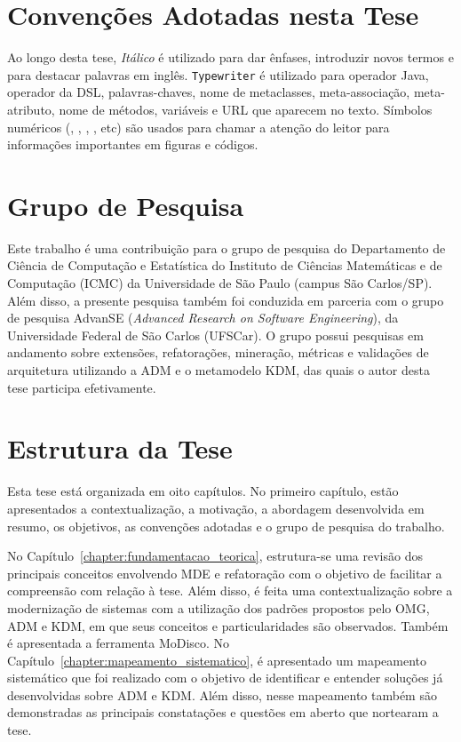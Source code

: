 \section{Convenções Adotadas nesta Tese}\label{sec:convencoes}

Ao longo desta tese, \textit{Itálico} é utilizado para dar ênfases, introduzir novos termos e para destacar palavras em inglês. \texttt{Typewriter} é utilizado para operador Java, operador da DSL, palavras-chaves, nome de metaclasses, meta-associação, meta-atributo, nome de métodos, variáveis e URL que aparecem no texto. Símbolos numéricos (, , , , etc) são usados para chamar a atenção do leitor para informações importantes em figuras e códigos.

\section{Grupo de Pesquisa}

Este trabalho é uma contribuição para o grupo de pesquisa do Departamento de Ciência de Computação e Estatística do Instituto de Ciências Matemáticas e de Computação (ICMC) da Universidade de São Paulo (campus São Carlos/SP). Além disso, a presente pesquisa também foi conduzida em parceria com o grupo de pesquisa AdvanSE (\textit{Advanced Research on Software Engineering}), da Universidade Federal de São Carlos (UFSCar). O grupo possui pesquisas em andamento sobre extensões, refatorações, mineração, métricas e validações de arquitetura utilizando a ADM e o metamodelo KDM, das quais o autor desta tese participa efetivamente.

\section{Estrutura da Tese}

Esta tese está organizada em oito capítulos. No primeiro capítulo, estão apresentados a contextualização, a motivação, a abordagem desenvolvida em resumo, os objetivos, as convenções adotadas e o grupo de pesquisa do trabalho. 

No Capítulo~\ref{chapter:fundamentacao_teorica}, estrutura-se uma revisão dos principais conceitos envolvendo MDE e refatoração com o objetivo de facilitar a compreensão  com relação à tese. Além disso, é feita uma contextualização sobre a modernização de sistemas com a utilização dos padrões propostos pelo OMG, ADM e KDM, em que seus conceitos e particularidades são observados. Também é apresentada a ferramenta MoDisco. 
%
%
No Capítulo~\ref{chapter:mapeamento_sistematico}, é apresentado um mapeamento sistemático que foi realizado com o objetivo de identificar e entender soluções já desenvolvidas sobre ADM e KDM. Além disso, nesse mapeamento também são demonstradas as principais constatações e questões em aberto que nortearam a tese.

